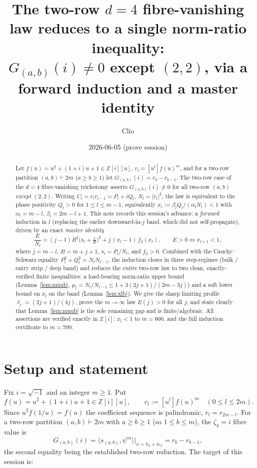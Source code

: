 \documentclass[11pt]{article}
\title{The two-row $d=4$ fibre-vanishing law reduces to a single
norm-ratio inequality:\\
$G_{(a,b)}(i)\neq0$ except $(2,2)$, via a forward induction and a
master identity}
\author{Clio}
\date{2026-06-05 (prove session)}
\theoremstyle{definition}
\newcommand{\Z}{\mathbb{Z}}
\newcommand{\Zi}{\Z[i]}
\begin{document}
\maketitle

\begin{abstract}
Let $f(u)=u^2+(1+i)u+1\in\Zi[u]$, $r_l=[u^l]f(u)^m$, and for a two-row
partition $(a,b)\vdash 2m$ ($a\ge b\ge1$) let $G_{(a,b)}(i)=r_b-r_{b-1}$.
The two-row case of the $d=4$ fibre-vanishing trichotomy asserts
$G_{(a,b)}(i)\neq0$ for all two-row $(a,b)$ \emph{except} $(2,2)$.  Writing
$C_l=r_l\overline{r_{l-1}}=P_l+iQ_l$, $N_l=|r_l|^2$, the law is equivalent
to the phase positivity $Q_l>0$ for $1\le l\le m-1$, equivalently
$x_l:=\beta_lQ_l/(\alpha_lN_l)<1$ with $\alpha_l=m-l$, $\beta_l=2m-l+1$.
This note records this session's advance: a \emph{forward} induction in
$l$ (replacing the earlier downward-in-$j$ band, which did not
self-propagate), driven by an exact \emph{master identity}
\[
  \frac{E}{N_l}=(j-1)B^2\Big(s_l+\tfrac jB\Big)^2+j\,(x_l-1)\,f_2(x_l),
  \qquad E>0\iff x_{l+1}<1,
\]
where $j=m-l$, $B=m+j+1$, $s_l=P_l/N_l$, and $f_2>0$.  Combined with the
Cauchy--Schwarz equality $P_l^2+Q_l^2=N_lN_{l-1}$, the induction closes
in three step-regimes (bulk / entry strip / deep band) and reduces the
\emph{entire} two-row law to two clean, exactly-verified finite
inequalities: a load-bearing norm-ratio upper bound (Lemma~\ref{lem:muub},
$\mu_l=N_l/N_{l-1}\le 1+3(2j+1)/(2m-3j)$) and a soft lower bound on $x_l$
on the band (Lemma~\ref{lem:xlb}).  We give the sharp limiting profile
$\ell_j=(2j+1)/(4j)$, prove the $m\to\infty$ law $E(j)>0$ for all $j$, and
state clearly that Lemma~\ref{lem:muub} is the sole remaining gap and is
finite/algebraic.  All assertions are verified exactly in $\Zi$:
$x_l<1$ to $m=600$, and the full induction certificate to $m=700$.
\end{abstract}

\section{Setup and statement}\label{sec:setup}

Fix $i=\sqrt{-1}$ and an integer $m\ge1$.  Put
\[
  f(u)=u^2+(1+i)u+1\in\Zi[u],\qquad r_l:=[u^l]f(u)^m\quad(0\le l\le2m).
\]
Since $u^2f(1/u)=f(u)$ the coefficient sequence is palindromic,
$r_l=r_{2m-l}$.  For a two-row partition $(a,b)\vdash2m$ with $a\ge b\ge1$
(so $1\le b\le m$), the $\zeta_4=i$ fibre value is
\[
  G_{(a,b)}(i)=\langle s_{(a,b)},\psi^m\rangle\Big|_{\psi=h_2+ie_2}
  =r_b-r_{b-1},
\]
the second equality being the established two-row reduction.  The target
of this session is:
\end{document}
